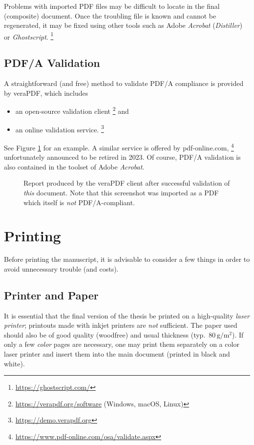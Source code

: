 Problems with imported PDF files may be difficult to locate in the final (composite)
document. Once the troubling file is known and cannot be regenerated, it may be fixed using 
other tools such as Adobe \emph{Acrobat} (\emph{Distiller}) or \emph{Ghostscript}.%
\footnote{\url{https://ghostscript.com/}}


\subsection{PDF/A Validation}
\label{sec:PDFA-validation}

A straightforward (and free) method to validate PDF/A compliance is provided by
\textsf{veraPDF}, which includes
%
\begin{itemize}
\item an open-source validation client%
  \footnote{\url{https://verapdf.org/software} (Windows, macOS, Linux)} and
\item an online validation service.%
  \footnote{\url{https://demo.verapdf.org}}
\end{itemize}
%
See Figure \ref{fig:verapdf-report} for an example.
A similar service is offered by \textsf{pdf-online.com},%
\footnote{\url{https://www.pdf-online.com/osa/validate.aspx}}
unfortunately announced to be retired in 2023.
Of course, PDF/A validation is also contained in the toolset of Adobe \emph{Acrobat}.

\begin{figure}[htbp]
    \centering
    \caption{Report produced by the \textsf{veraPDF} client after successful validation
    of \emph{this} document. Note that this screenshot was imported as a PDF 
    which itself is \emph{not} PDF/A-compliant.}
    \label{fig:verapdf-report}
\end{figure}



\section{Printing}

Before printing the manuscript, it is advisable to consider a few things in
order to avoid unnecessary trouble (and costs).


\subsection{Printer and Paper}

It is essential that the final version of the thesis be printed on a high-quality
\emph{laser printer}; printouts made with inkjet printers are \emph{not} sufficient.
The paper used should also be of good quality (woodfree) and usual thickness 
(typ.\ $80\,\mathrm{g} / \mathrm{m}^2$). If only a few \emph{color} pages are
necessary, one may print them separately on a color laser printer and insert
them into the main document (printed in black and white).

